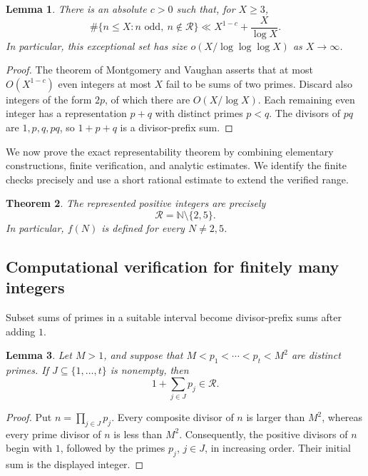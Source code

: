 \documentclass[11pt,letterpaper,reqno]{amsart}
\numberwithin{equation}{section}
\newtheorem{theorem}{Theorem}[section]
\newtheorem{lemma}[theorem]{Lemma}
\theoremstyle{remark}
\newcommand{\N}{\mathbb{N}}
\newcommand{\Rcal}{\mathcal{R}}
\renewcommand{\leq}{\leqslant}
\renewcommand{\geq}{\geqslant}
\begin{document}
\begin{lemma}
\label{lem:analytic-odd-representability}
There is an absolute $c>0$ such that, for $X\geq3$,
\[
 \#\{n\leq X:n\text{ odd},\ n\notin\Rcal\}
 \ll X^{1-c}+\frac{X}{\log X}.
\]
In particular, this exceptional set has size
$o(X/\log\log\log X)$ as $X\to\infty$.
\end{lemma}

\begin{proof}
The theorem of Montgomery and Vaughan \cite{MVGoldbach}
asserts that at most $O(X^{1-c})$ even integers at most $X$ fail to
be sums of two primes. Discard also integers of the form $2p$, of
which there are $O(X/\log X)$. Each remaining even integer has a
representation $p+q$ with distinct primes $p<q$. The divisors of
$pq$ are $1,p,q,pq$, so $1+p+q$ is a divisor-prefix sum.
\end{proof}

We now prove the exact representability theorem by combining elementary
constructions, finite verification, and analytic estimates. We identify the
finite checks precisely and use a short rational estimate to extend the
verified range.

\begin{theorem}
\label{thm:fraiture-representability}
The represented positive integers are precisely
\[
 \Rcal=\N\setminus\{2,5\}.
\]
In particular, $f(N)$ is defined for every $N\neq2,5$.
\end{theorem}

\subsection{Computational verification for finitely many integers}

Subset sums of primes in a suitable interval become divisor-prefix sums after adding $1$.

\begin{lemma}
\label{lem:fraiture-prime-window}
Let $M>1$, and suppose that
$M<p_1<\cdots<p_t<M^2$ are distinct primes. If
$J\subseteq\{1,\ldots,t\}$ is nonempty, then
\[
 1+\sum_{j\in J}p_j\in\Rcal.
\]
\end{lemma}

\begin{proof}
Put $n=\prod_{j\in J}p_j$. Every composite divisor of $n$ is larger than
$M^2$, whereas every prime divisor of $n$ is less than $M^2$.
Consequently, the positive divisors of $n$ begin with $1$, followed by the
primes $p_j$, $j\in J$, in increasing order. Their initial sum is the
displayed integer.
\end{proof}
\end{document}
